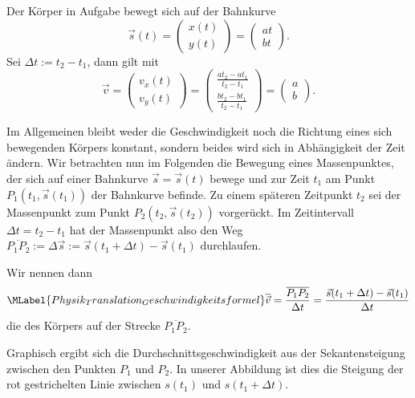 \begin{MContent}
\begin{MExercise}
 \begin{MSolution} Der K\"orper in Aufgabe  bewegt sich auf der Bahnkurve
 \begin{equation*}
 \vec{s}(t)= \left(\begin{array}{c} x(t) \\ y(t) \end{array}\right)=\left(\begin{array}{c} a t \\ b t \end{array}\right).
 \end{equation*}Sei $\Delta t:=t_2-t_1$, dann gilt mit 
 \begin{equation*}
 \vec{v}= \left(\begin{array}{c} v_x(t) \\ v_y(t) \end{array}\right)= \left(\begin{array}{c} \frac{a t_2-a t_1}{t_2-t_1} \\ \frac{b t_2-b t_1}{t_2-t_1} \end{array}\right)=\left(\begin{array}{c} a \\ b \end{array}\right).
 \end{equation*}
 \end{MSolution}
 \end{MExercise}

 
 
 Im Allgemeinen bleibt weder die Geschwindigkeit noch die Richtung eines sich bewegenden K\"orpers konstant, sondern beides wird sich in Abh\"angigkeit der Zeit \"andern. Wir betrachten nun im Folgenden die Bewegung eines Massenpunktes, der sich auf einer Bahnkurve $\vec{s}=\vec{s}(t)$ bewege und zur Zeit $t_1$ am Punkt $P_1(t_1,\vec{s}(t_1))$ der Bahnkurve befinde. Zu einem sp\"ateren Zeitpunkt $t_2$ sei der Massenpunkt zum Punkt $P_2(t_2,\vec{s}(t_2))$ vorger\"uckt. Im Zeitintervall $\Delta t=t_2-t_1$ hat der Massenpunkt also den Weg $\overline{P_1P_2}:=\Delta \vec{s}:=\vec{s}(t_1+\Delta t)-\vec{s}(t_1)$ durchlaufen.
 
 
 
 
 \begin{MInfo}
    Wir nennen dann \begin{equation}\MLabel{Physik_Translation_Geschwindigkeitsformel}
   \overline{\vec{v}}=\frac{\overline{P_1P_2}}{\Delta t}=\frac{\vec{s}(t_1+\Delta t)-\vec{s}(t_1)}{\Delta t}
   \end{equation} die  des K\"orpers auf der Strecke $\overline{P_1P_2}$. 
  \end{MInfo}
  Graphisch ergibt sich die Durchschnittsgeschwindigkeit aus der Sekantensteigung zwischen den Punkten $P_1$ und $P_2$. In unserer Abbildung ist dies die Steigung der rot gestrichelten Linie zwischen $s(t_1)$ und $s(t_1+\Delta t)$.
  

\end{MContent}

